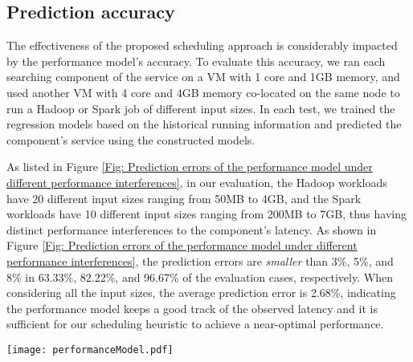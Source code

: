 \documentclass[10pt, conference, compsocconf]{IEEEtran}
\begin{document}
\subsection{Prediction accuracy} \label{Section: Prediction accuracy}
The effectiveness of the proposed scheduling approach is considerably impacted by the performance model's accuracy. To evaluate this accuracy, we ran each searching component of the service on a VM with 1 core and 1GB memory, and used another VM with 4 core and 4GB memory co-located on the same node to run a Hadoop or Spark job of different input sizes. In each test, we trained the regression models based on the historical running information and predicted the component's service using the constructed models.















As listed in Figure \ref{Fig: Prediction errors of the performance model under different performance interferences}, in our evaluation, the Hadoop workloads have 20 different input sizes ranging from 50MB to 4GB, and the Spark workloads have 10 different input sizes ranging from 200MB to 7GB, thus having distinct performance interferences to the component's latency. As shown in Figure \ref{Fig: Prediction errors of the performance model under different performance interferences}, the prediction errors are \emph{smaller} than 3\%, 5\%, and 8\% in 63.33\%, 82.22\%, and 96.67\% of the evaluation cases, respectively. When considering all the input sizes, the average prediction error is 2.68\%, indicating the performance model keeps a good track of the observed latency and it is sufficient for our scheduling heuristic to achieve a near-optimal performance.



\begin{figure*}
\centering
  \texttt{[image: performanceModel.pdf]}\\
  \caption{Prediction errors of the performance model under different performance interferences}
  \label{Fig: Prediction errors of the performance model under different performance interferences}
\end{figure*}
\end{document}
